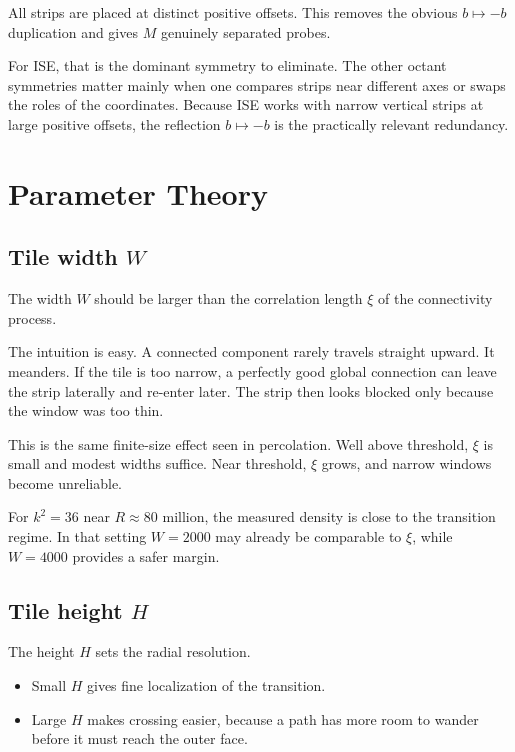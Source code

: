 \documentclass[12pt,letterpaper]{article}
\theoremstyle{definition}
\theoremstyle{remark}
\begin{document}
All strips are placed at distinct positive offsets. This removes the obvious $b\mapsto -b$ duplication and gives $M$ genuinely separated probes.

For ISE, that is the dominant symmetry to eliminate. The other octant symmetries matter mainly when one compares strips near different axes or swaps the roles of the coordinates. Because ISE works with narrow vertical strips at large positive offsets, the reflection $b\mapsto -b$ is the practically relevant redundancy.

\section{Parameter Theory}

\subsection{Tile width \texorpdfstring{$W$}{W}}

The width $W$ should be larger than the correlation length $\xi$ of the connectivity process.

The intuition is easy. A connected component rarely travels straight upward. It meanders. If the tile is too narrow, a perfectly good global connection can leave the strip laterally and re-enter later. The strip then looks blocked only because the window was too thin.

This is the same finite-size effect seen in percolation. Well above threshold, $\xi$ is small and modest widths suffice. Near threshold, $\xi$ grows, and narrow windows become unreliable.

For $k^2=36$ near $R\approx 80$ million, the measured density is close to the transition regime. In that setting $W=2000$ may already be comparable to $\xi$, while $W=4000$ provides a safer margin.

\subsection{Tile height \texorpdfstring{$H$}{H}}

The height $H$ sets the radial resolution.

\begin{itemize}
\item Small $H$ gives fine localization of the transition.
\item Large $H$ makes crossing easier, because a path has more room to wander before it must reach the outer face.
\end{itemize}
\end{document}
